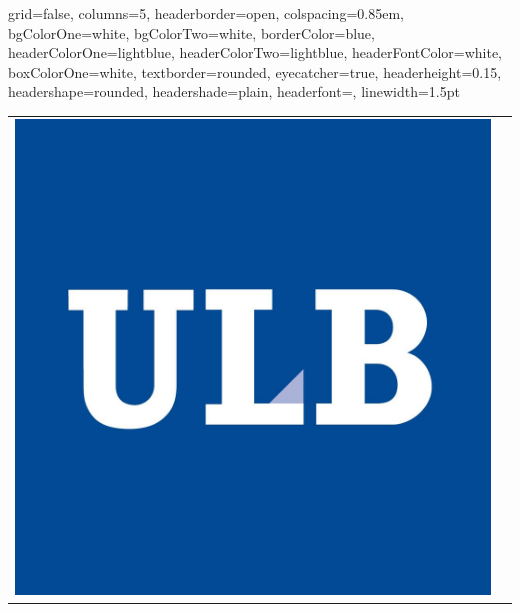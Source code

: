\documentclass[a0paper,portrait]{baposter}
\begin{document}

\begin{poster}
{
grid=false,
columns=5,
headerborder=open, %
colspacing=0.85em, %
bgColorOne=white, %
bgColorTwo=white, %
borderColor=blue, %
headerColorOne=lightblue, %
headerColorTwo=lightblue, %
headerFontColor=white, %
boxColorOne=white, %
textborder=rounded, %
eyecatcher=true, %
headerheight=0.15\textheight, %
headershape=rounded, %
headershade=plain,
headerfont=\Large\textsf, %
linewidth=1.5pt %
}
  {
  \begin{minipage}{0.12\textwidth}
  \begin{tabular}{@{} l l @{}}
    \includegraphics[width=0.7\linewidth]{logos/logo_ulb.png} \\[0.5cm]

\end{tabular}
\end{minipage}}
\end{poster}
\end{document}
